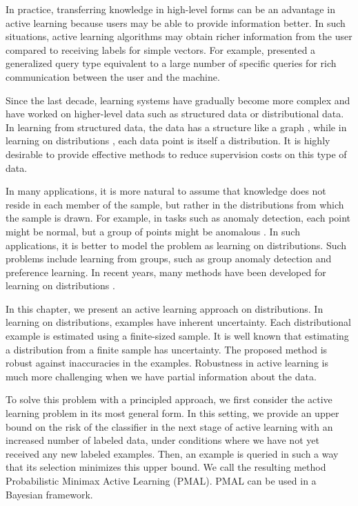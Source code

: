 \documentclass[12pt]{article}
\begin{document}
	In practice, transferring knowledge in high-level forms can be an advantage in active learning because users may be able to provide information better. In such situations, active learning algorithms may obtain richer information from the user compared to receiving labels for simple vectors. For example, \cite{gilad2015active} presented a generalized query type equivalent to a large number of specific queries for rich communication between the user and the machine.
	
	Since the last decade, learning systems have gradually become more complex and have worked on higher-level data such as structured data or distributional data. In learning from structured data, the data has a structure like a graph \cite{lampert2009structured}, while in learning on distributions \cite{sriperumbudur2009kernel}, each data point is itself a distribution. It is highly desirable to provide effective methods to reduce supervision costs on this type of data.
	
	In many applications, it is more natural to assume that knowledge does not reside in each member of the sample, but rather in the distributions from which the sample is drawn. For example, in tasks such as anomaly detection, each point might be normal, but a group of points might be anomalous \cite{nguyen2007kernel}. In such applications, it is better to model the problem as learning on distributions. Such problems include learning from groups, such as group anomaly detection and preference learning. In recent years, many methods have been developed for learning on distributions \cite{flaxman2015fast, szabo2015learning, muandet2012domain, borgwardt2006integrating}.
	
	In this chapter, we present an active learning approach on distributions. In learning on distributions, examples have inherent uncertainty. Each distributional example is estimated using a finite-sized sample. It is well known that estimating a distribution from a finite sample has uncertainty. The proposed method is robust against inaccuracies in the examples. Robustness in active learning is much more challenging when we have partial information about the data.
	
	To solve this problem with a principled approach, we first consider the active learning problem in its most general form. In this setting, we provide an upper bound on the risk of the classifier in the next stage of active learning with an increased number of labeled data, under conditions where we have not yet received any new labeled examples. Then, an example is queried in such a way that its selection minimizes this upper bound. We call the resulting method Probabilistic Minimax Active Learning (PMAL). PMAL can be used in a Bayesian framework.
	
\end{document}
